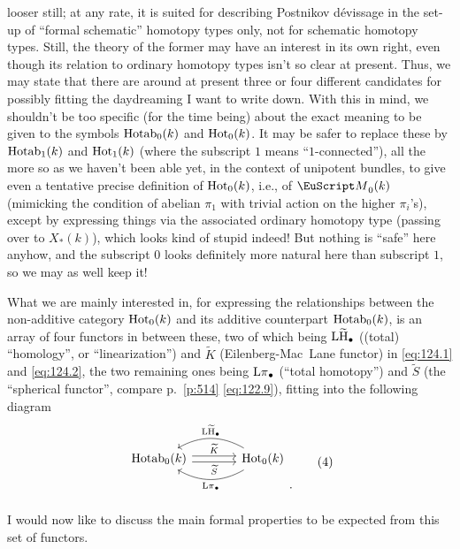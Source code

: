 looser still; at any rate, it is suited for describing Postnikov
dévissage in the set-up of ``formal schematic'' homotopy types only,
not for schematic homotopy types. Still, the theory of the former may
have an interest in its own right, even though its relation to
ordinary homotopy types isn't so clear at present. Thus, we may state
that there are around at present three or four different candidates
for possibly fitting the daydreaming I want to write down.
With this in mind, we shouldn't be too specific (for the time being)
about the exact meaning to be given to the symbols $\operatorname{Hotab}_0(k)$ and
$\operatorname{Hot}_0(k)$. It may be safer to replace these by $\operatorname{Hotab}_1(k)$ and
$\operatorname{Hot}_1(k)$ (where the subscript $1$ means ``$1$-connected''), all
the more so as we haven't been able yet, in the context of unipotent
bundles, to give even a tentative precise definition of $\operatorname{Hot}_0(k)$,
i.e., of $\scrM_0(k)$ (mimicking the condition of abelian $\pi_1$ with
trivial action on the higher $\pi_i$'s), except by expressing things
via the associated ordinary homotopy type (passing over to $X_*(k)$),
which looks kind of stupid indeed! But nothing is ``safe'' here
anyhow, and the subscript $0$ looks definitely more natural here than
subscript $1$, so we may as well keep it!

\bigbreak

\presectionfill{}\par

What we are mainly interested in, for expressing the relationships
between the non-additive category $\operatorname{Hot}_0(k)$ and its additive
counterpart $\operatorname{Hotab}_0(k)$, is an array of four functors in between
these, two of which being $\operatorname{L\widetilde H}_\bullet$ ((total) ``homology'', or
``linearization'') and $\widetilde K$ (Eilenberg-Mac~Lane functor) in
\eqref{eq:124.1} and \eqref{eq:124.2}, the two remaining ones being
$\operatorname{L\pi}_\bullet$ (``total homotopy'') and $\widetilde S$ (the
``spherical functor'', compare p.~\ref{p:514} \eqref{eq:122.9}),
fitting into the following diagram
\begin{equation}
  \label{eq:124.4}
  \begin{tabular}{@{}c@{}}
    \begin{tikzcd}[baseline=(O.base),sep=large]
      \HotabOf_0(k) \ar[r,shift left,"\widetilde K"]
      \ar[r,shift right,"\widetilde S"'] &
      \HotOf_0(k) \ar[l,bend right,"\LtH_\bullet"{swap}]
      \ar[l,bend left,"\Lpi_\bullet"{name=O}] \\
    \end{tikzcd}.
  \end{tabular}\tag{4}
\end{equation}
I would now like to discuss the main formal properties to be expected
from this set of functors.

